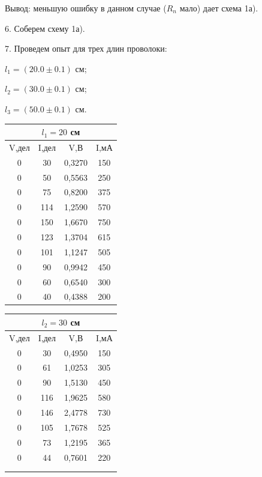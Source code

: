 \documentclass[14pt]{article}
\begin{document}
	Вывод: меньшую ошибку в данном случае ($R_n$ мало) дает схема 1а).
	
	\vspace{0.5cm}
	6. Соберем схему 1а).
	
	\vspace{0.5cm}
	7. Проведем опыт для трех длин проволоки:
	
	\hspace{2cm}$l_1 = (20.0 \pm 0.1)$ см;
	
	\hspace{2cm}$l_2 = (30.0 \pm 0.1)$ см;
	
	\hspace{2cm}$l_3 = (50.0 \pm 0.1)$ см.
	
	\vspace{1cm}
   	\hspace*{-1.5cm}
	\begin{tabular}{|*{4}{c|}}
	\hline
	\multicolumn{4}{|c|}{$l_1 = 20$ см}\\
	\hline 
	V,дел & I,дел & V,В & I,мА\\ 
	\hline 
	0 & 30 & 0,3270 & 150 \\ 	
	\hline 
	0 & 50 & 0,5563 & 250 \\ 
	\hline 
	0 & 75 & 0,8200 & 375 \\ 
	\hline 
 	0 & 114 & 1,2590 & 570 \\ 
	\hline 
	0 & 150 & 1,6670 & 750 \\ 
	\hline 
 	0 & 123 & 1,3704 & 615 \\ 
	\hline 
 	0 & 101 & 1,1247 & 505 \\ 
	\hline 
 	0 & 90 & 0,9942 & 450 \\ 
	\hline 
 	0 & 60 & 0,6540 & 300 \\ 
	\hline 
 	0 & 40 & 0,4388 & 200 \\ 
	\hline 
	\end{tabular}  
	\begin{tabular}[l]{|*{4}{c|}}
	\hline
	\multicolumn{4}{|c|}{$l_2 = 30$ см}\\
	\hline 
	V,дел & I,дел & V,В & I,мА\\ 
	\hline
	0 & 30 & 0,4950 & 150 \\ 
	\hline 
	0 & 61 & 1,0253 & 305 \\ 
	\hline 
	0 & 90 & 1,5130 & 450 \\ 
	\hline 
	0 & 116 & 1,9625 & 580 \\ 
	\hline 
	0 & 146 & 2,4778 & 730 \\ 
	\hline 
	0 & 105 & 1,7678 & 525 \\ 
	\hline 
	0 & 73 & 1,2195 & 365 \\ 
	\hline 
	0 & 44 & 0,7601 & 220 \\ 
	\hline	
	& & & \\
	\hline
	& & & \\
	\hline 
	\end{tabular}
\end{document}
